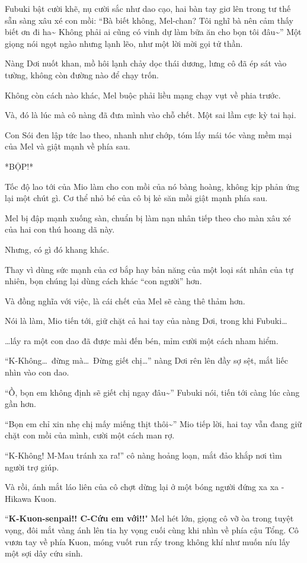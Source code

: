 \documentclass[../main.tex]{subfiles}
\begin{document}
Fubuki bật cười khẽ, nụ cười sắc như dao cạo, hai bàn tay giơ lên trong tư thế sẵn sàng xâu xé con mồi: ``Bà biết không, Mel-chan? Tôi nghĩ bà nên cảm thấy biết ơn đi ha\~{} Không phải ai cũng có vinh dự làm bữa ăn cho bọn tôi đâu\~{}'' Một giọng nói ngọt ngào nhưng lạnh lẽo, như một lời mời gọi tử thần.

Nàng Dơi nuốt khan, mồ hôi lạnh chảy dọc thái dương, lưng cô đã ép sát vào tường, không còn đường nào để chạy trốn.

Không còn cách nào khác, Mel buộc phải liều mạng chạy vụt về phia trước.

Và, đó là lúc mà cô nàng đã đưa mình vào chỗ chết. Một sai lầm cực kỳ tai hại.

Con Sói đen lập tức lao theo, nhanh như chớp, tóm lấy mái tóc vàng mềm mại của Mel và giật mạnh về phía sau.

*BỘP!*

Tốc độ lao tới của Mio làm cho con mồi của nó bàng hoàng, không kịp phản ứng lại một chút gì. Cơ thể nhỏ bé của cô bị kẻ săn mồi giật mạnh phía sau.

Mel bị đập mạnh xuống sàn, chuẩn bị làm nạn nhân tiếp theo cho màn xâu xé của hai con thú hoang dã này.

Nhưng, có gì đó khang khác.

Thay vì dùng sức mạnh của cơ bắp hay bản năng của một loại sát nhân của tự nhiên, bọn chúng lại dùng cách khác ``con người'' hơn.

Và đồng nghĩa với việc, là cái chết của Mel sẽ càng thê thảm hơn.

Nói là làm, Mio tiến tới, giữ chặt cả hai tay của nàng Dơi, trong khi Fubuki\dots

\dots lấy ra một con dao đã được mài đến bén, mỉm cười một cách nham hiểm.

``K-Không\dots\ đừng mà\dots\ Đừng giết chị\dots'' nàng Dơi rên lên đầy sợ sệt, mắt liếc nhìn vào con dao.

``Ồ, bọn em không định sẽ giết chị ngay đâu\~{}'' Fubuki nói, tiến tới càng lúc càng gần hơn.

``Bọn em chỉ xin nhẹ chị mấy miếng thịt thôi\~{}'' Mio tiếp lời, hai tay vẫn đang giữ chặt con mồi của mình, cười một cách man rợ.

``K-Không! M-Mau tránh xa ra!'' cô nàng hoảng loạn, mắt đảo khắp nơi tìm người trợ giúp.

Và rồi, ánh mắt láo liên của cô chợt dừng lại ở một bóng người đứng xa xa - Hikawa Kuon.

``\textbf{K-Kuon-senpai!! C-Cứu em với!!}" Mel hét lớn, giọng cô vỡ òa trong tuyệt vọng, đôi mắt vàng ánh lên tia hy vọng cuối cùng khi nhìn về phía cậu Tổng. Cô vươn tay về phía Kuon, móng vuốt run rẩy trong không khí như muốn níu lấy một sợi dây cứu sinh.
\end{document}
